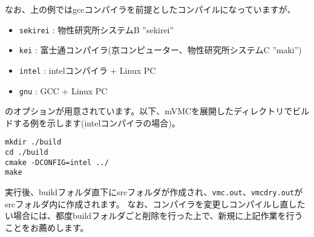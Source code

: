 なお、上の例ではgccコンパイラを前提としたコンパイルになっていますが、
\begin{itemize}
\item \verb|sekirei| : 物性研究所システムB ''sekirei''
\item \verb|kei| : 富士通コンパイラ(京コンピューター、物性研究所システムC ''maki'')
\item \verb|intel| : intelコンパイラ + Linux PC
\item \verb|gnu| : GCC + Linux PC
\end{itemize}
のオプションが用意されています。以下、mVMCを展開したディレクトリでビルドする例を示します(intelコンパイラの場合)。
\begin{verbatim}
mkdir ./build
cd ./build
cmake -DCONFIG=intel ../
make
\end{verbatim}
実行後、buildフォルダ直下にsrcフォルダが作成され、\verb|vmc.out|、\verb|vmcdry.out|がsrcフォルダ内に作成されます。
なお、コンパイラを変更しコンパイルし直したい場合には、都度buildフォルダごと削除を行った上で、新規に上記作業を行うことをお薦めします。

